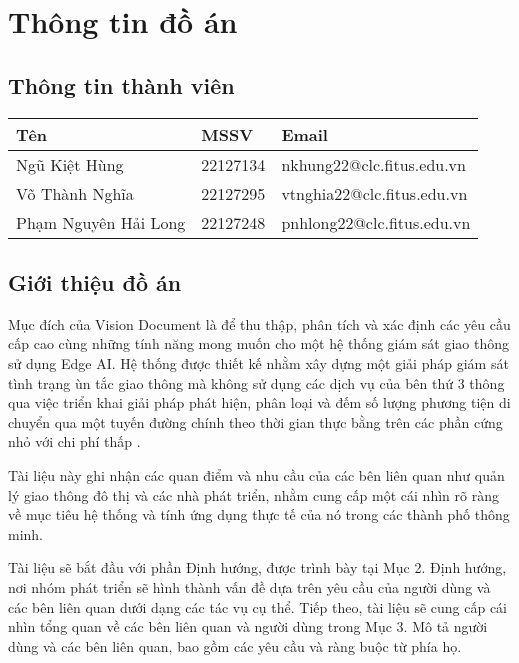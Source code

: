 \section{Thông tin đồ án}

\subsection{Thông tin thành viên}

\begin{table}[!ht]
\centering
\renewcommand{\arraystretch}{1.25}
\begin{tabular}{|>{\centering\arraybackslash}m{5cm}|>{\centering\arraybackslash}m{3cm}|>{\centering\arraybackslash}m{8cm}|}
    \hline
    \Large \textbf{Tên} & \Large \textbf{MSSV} & \Large \textbf{Email} \\
    \hline
    \Large Ngũ Kiệt Hùng & \Large 22127134 & \Large nkhung22@clc.fitus.edu.vn \\
    \hline
    \Large Võ Thành Nghĩa & \Large 22127295 & \Large vtnghia22@clc.fitus.edu.vn \\
    \hline
    \normalsize Phạm Nguyên Hải Long  & \Large 22127248 & \Large pnhlong22@clc.fitus.edu.vn \\
    \hline
\end{tabular}
\end{table}

\subsection{Giới thiệu đồ án}
\quad Mục đích của Vision Document là để thu thập, phân tích và xác định các yêu cầu cấp cao cùng những tính năng mong muốn cho một hệ thống giám sát giao thông sử dụng Edge AI. Hệ thống được thiết kế nhằm xây dựng một giải pháp giám sát tình trạng ùn tắc giao thông mà không sử dụng các dịch vụ của bên thứ 3 thông qua việc triển khai giải pháp phát hiện, phân loại và đếm số lượng phương tiện di chuyển qua một tuyến đường chính theo thời gian thực bằng  trên các phần cứng nhỏ với chi phí thấp .

\quad Tài liệu này ghi nhận các quan điểm và nhu cầu của các bên liên quan như quản lý giao thông đô thị và các nhà phát triển, nhằm cung cấp một cái nhìn rõ ràng về mục tiêu hệ thống và tính ứng dụng thực tế của nó trong các thành phố thông minh.

\quad Tài liệu sẽ bắt đầu với phần Định hướng, được trình bày tại Mục 2. Định hướng, nơi nhóm phát triển sẽ hình thành vấn đề dựa trên yêu cầu của người dùng và các bên liên quan dưới dạng các tác vụ cụ thể. Tiếp theo, tài liệu sẽ cung cấp cái nhìn tổng quan về các bên liên quan và người dùng trong Mục 3. Mô tả người dùng và các bên liên quan, bao gồm các yêu cầu và ràng buộc từ phía họ.


